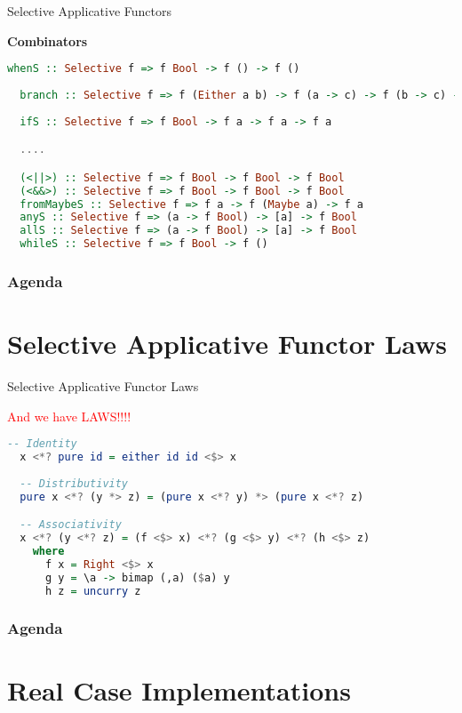 \documentclass{beamer}
\begin{document}
\begin{frame}[fragile]{Selective Applicative Functors}

\textbf{Combinators}

\begin{lstlisting}[language=Haskell]
  whenS :: Selective f => f Bool -> f () -> f () 
 
  branch :: Selective f => f (Either a b) -> f (a -> c) -> f (b -> c) -> f c
  
  ifS :: Selective f => f Bool -> f a -> f a -> f a

  ....

  (<||>) :: Selective f => f Bool -> f Bool -> f Bool
  (<&&>) :: Selective f => f Bool -> f Bool -> f Bool
  fromMaybeS :: Selective f => f a -> f (Maybe a) -> f a
  anyS :: Selective f => (a -> f Bool) -> [a] -> f Bool 
  allS :: Selective f => (a -> f Bool) -> [a] -> f Bool 
  whileS :: Selective f => f Bool -> f ()
\end{lstlisting}
\end{frame}

\begin{frame}
  \frametitle{Agenda}
  \section{Selective Applicative Functor Laws}
  \tableofcontents[currentsection]
\end{frame}
\begin{frame}[fragile]{Selective Applicative Functor Laws}

  \begin{block}{}
   \textcolor{red}{And we have LAWS!!!!}    
 \end{block}

\begin{lstlisting}[language=Haskell]
  -- Identity
  x <*? pure id = either id id <$> x
 
  -- Distributivity
  pure x <*? (y *> z) = (pure x <*? y) *> (pure x <*? z)

  -- Associativity 
  x <*? (y <*? z) = (f <$> x) <*? (g <$> y) <*? (h <$> z)
    where
      f x = Right <$> x
      g y = \a -> bimap (,a) ($a) y
      h z = uncurry z
\end{lstlisting}
\end{frame}


\begin{frame}
  \frametitle{Agenda}
  \section{Real Case Implementations}
  \tableofcontents[currentsection]
\end{frame}
\end{document}
